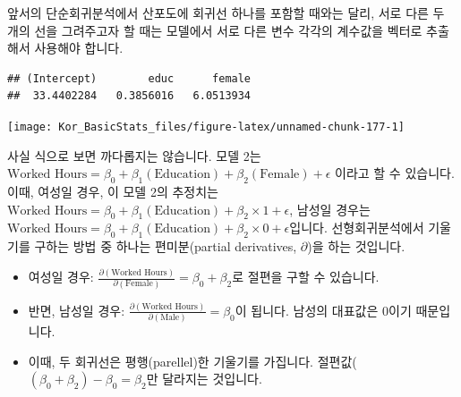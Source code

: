 \documentclass[]{book}
\newenvironment{Shaded}{\begin{snugshade}}{\end{snugshade}}
\newcommand{\CommentTok}[1]{\textcolor[rgb]{0.56,0.35,0.01}{\textit{#1}}}
\newcommand{\DataTypeTok}[1]{\textcolor[rgb]{0.13,0.29,0.53}{#1}}
\newcommand{\DecValTok}[1]{\textcolor[rgb]{0.00,0.00,0.81}{#1}}
\newcommand{\KeywordTok}[1]{\textcolor[rgb]{0.13,0.29,0.53}{\textbf{#1}}}
\newcommand{\NormalTok}[1]{#1}
\newcommand{\OperatorTok}[1]{\textcolor[rgb]{0.81,0.36,0.00}{\textbf{#1}}}
\newcommand{\StringTok}[1]{\textcolor[rgb]{0.31,0.60,0.02}{#1}}
\begin{document}
앞서의 단순회귀분석에서 산포도에 회귀선 하나를 포함할 때와는 달리, 서로 다른 두 개의 선을 그려주고자 할 때는 모델에서 서로 다른 변수 각각의 계수값을 벡터로 추출해서 사용해야 합니다.

\begin{Shaded}
\end{Shaded}

\begin{verbatim}
## (Intercept)        educ      female 
##  33.4402284   0.3856016   6.0513934
\end{verbatim}

\begin{Shaded}
\end{Shaded}

\begin{center}\texttt{[image: Kor\_BasicStats\_files/figure-latex/unnamed-chunk-177-1]} \end{center}

사실 식으로 보면 까다롭지는 않습니다. 모델 2는 \(\text{Worked Hours} = \beta_0 + \beta_1(\text{Education}) + \beta_2(\text{Female}) + \epsilon\) 이라고 할 수 있습니다. 이때, 여성일 경우, 이 모델 2의 추정치는 \(\text{Worked Hours} = \beta_0 + \beta_1(\text{Education}) + \beta_2 \times 1 + \epsilon\), 남성일 경우는 \(\text{Worked Hours} = \beta_0 + \beta_1(\text{Education}) + \beta_2 \times 0 + \epsilon\)입니다. 선형회귀분석에서 기울기를 구하는 방법 중 하나는 편미분(partial derivatives, \(\partial\))을 하는 것입니다.

\begin{itemize}
\item
  여성일 경우: \(\frac{\partial(\text{Worked Hours})}{\partial(\text{Female})} = \beta_0 + \beta_2\)로 절편을 구할 수 있습니다.
\item
  반면, 남성일 경우: \(\frac{\partial(\text{Worked Hours})}{\partial(\text{Male})} = \beta_0\)이 됩니다. 남성의 대표값은 0이기 때문입니다.
\item
  이때, 두 회귀선은 평행(parellel)한 기울기를 가집니다. 절편값(\((\beta_0 + \beta_2) - \beta_0 = \beta_2\)만 달라지는 것입니다.
\end{itemize}
\end{document}

